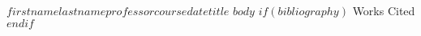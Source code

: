 \documentclass[12pt,letterpaper]{article}
\begin{document}
\begin{mla}{$firstname$}{$lastname$}{$professor$}{$course$}{$date$}{$title$}
    $body$
    $if(bibliography)$
    \newpage
    \centering Works Cited
    \printbibliography[heading=none]
    $endif$
\end{mla}
\end{document}
